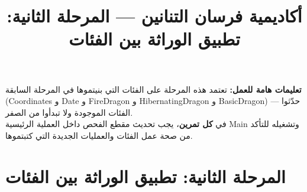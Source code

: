 \documentclass[14pt]{extarticle}
\title{أكاديمية فرسان التنانين — المرحلة الثانية: تطبيق الوراثة بين الفئات}
\begin{document}
\maketitle
\thispagestyle{fancy}

\begin{boxWarning}
\textbf{تعليمات هامة للعمل:}
تعتمد هذه المرحلة على الفئات التي بنيتموها في المرحلة السابقة (\textenglish{Coordinates} و \textenglish{Date} و \textenglish{FireDragon} و \textenglish{HibernatingDragon} و \textenglish{BasicDragon}) — حدّثوا الفئات الموجودة ولا تبدأوا من الصفر. \\
في \textbf{كل تمرين}، يجب تحديث مقطع الفحص داخل العملية الرئيسية \textenglish{Main} وتشغيله للتأكد من صحة عمل الفئات والعمليات الجديدة التي كتبتموها.
\end{boxWarning}

\section*{المرحلة الثانية: تطبيق الوراثة بين الفئات}
\end{document}
